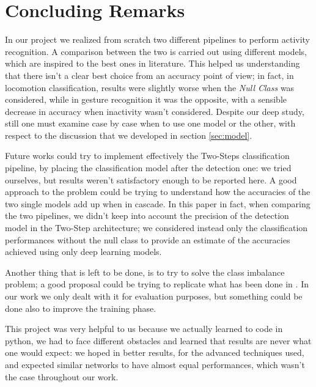 
\section{Concluding Remarks}
\label{sec:conclusions}

In our project we realized from scratch two different pipelines to perform activity recognition. A comparison between the two is carried out using different models, which are inspired to the best ones in literature. This helped us understanding that there isn’t a clear best choice from an accuracy point of view; in fact, in locomotion classification, results were slightly worse when the \textit{Null Class} was considered, while in gesture recognition it was the opposite, with a sensible decrease in accuracy when inactivity wasn’t considered. Despite our deep study, still one must examine case by case when to use one model or the other, with respect to the discussion that we developed in section \ref{sec:model}.

Future works could try to implement effectively the Two-Steps classification pipeline, by placing the classification model after the detection one: we tried ourselves, but results weren’t satisfactory enough to be reported here. A good approach to the problem could be trying to understand how the accuracies of the two single models add up when in cascade. In this paper in fact, when comparing the two pipelines, we didn’t keep into account the precision of the detection model in the Two-Step architecture; we considered instead only the classification performances without the null class to provide an estimate of the accuracies achieved using only deep learning models. 

Another thing that is left to be done, is to try to solve the class imbalance problem; a good proposal could be trying to replicate what has been done in \cite{japkowicz2002class}. In our work we only dealt with it for evaluation purposes, but something could be done also to improve the training phase.

This project was very helpful to us because we actually learned to code in python, we had to face different obstacles and learned that results are never what one would expect: we hoped in better results, for the advanced techniques used, and expected similar networks to have almost equal performances, which wasn't the case throughout our work.